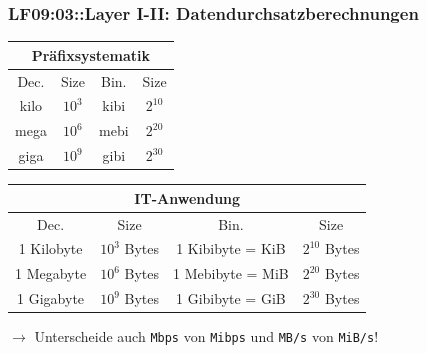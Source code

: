 \begin{frame}  
  \frametitle{LF09:03::Layer I-II: Datendurchsatzberechnungen }

  \begin{center}
  \begin{footnotesize}

  \renewcommand{\arraystretch}{1.5}
  \begin{tabular}{|c|c|c|c|}
    \multicolumn{4}{c}{Präfixsystematik}  \\
    \hline
    Dec. & Size & Bin. & Size \\
    \hline
    \hline
    kilo & $10^3$ & kibi &  $2^{10}$ \\
    \hline
    mega & $10^6$ & mebi &  $2^{20}$  \\
    \hline
    giga & $10^9$ & gibi &  $2^{30}$  \\
    \hline
  \end{tabular}

  \vspace{0.4cm}
  \renewcommand{\arraystretch}{1.5}
  \begin{tabular}{|c|c|c|c|}
    \multicolumn{4}{c}{IT-Anwendung} \\
    \hline
    Dec. & Size & Bin. & Size\\
    \hline
    \hline
    1 Kilobyte &  $10^3$ Bytes & 1 Kibibyte = KiB & $2^{10}$ Bytes \\
    \hline
    1 Megabyte &  $10^6$ Bytes & 1 Mebibyte = MiB & $2^{20}$ Bytes \\
    \hline
    1 Gigabyte &  $10^9$ Bytes & 1 Gibibyte = GiB & $2^{30}$ Bytes \\
    \hline
  \end{tabular}

\end{footnotesize}
\end{center}

\vspace{0.1cm}
$\rightarrow$ Unterscheide auch \texttt{Mbps} von \texttt{Mibps} und \texttt{MB/s} von \texttt{MiB/s}!

\end{frame}

